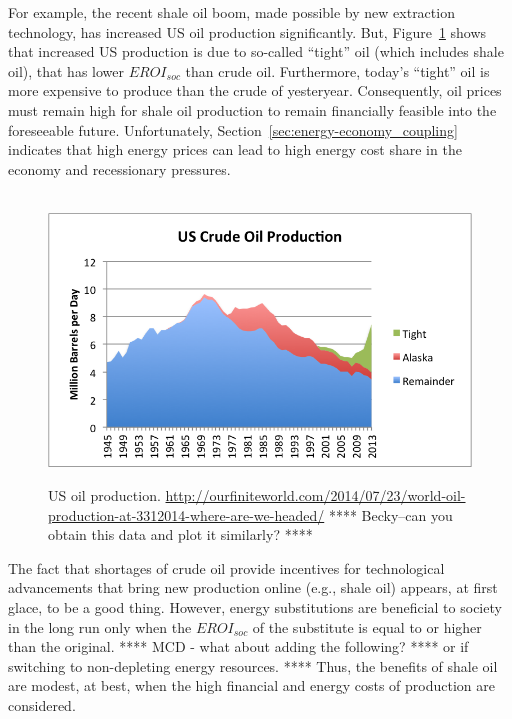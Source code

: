 For example, the recent shale oil boom, made possible by new extraction technology,
has increased US oil production significantly. 
But, Figure~\ref{fig:US_oil_production} shows that increased US production
is due to so-called ``tight'' oil (which includes shale oil), 
that has lower $EROI_{soc}$ than crude oil.\cite{Cleveland:2010aa}
Furthermore, today's ``tight'' oil is more expensive to produce 
than the crude of yesteryear.
Consequently, oil prices must remain high for 
shale oil production to remain financially feasible into the foreseeable future. 
Unfortunately, Section~\ref{sec:energy-economy_coupling} indicates that
high energy prices can lead to high energy cost share in the economy
and recessionary pressures.

\begin{figure}[!ht]
\centering\
\includegraphics[width=\linewidth]{Part_0/Chapter_Introduction/images/us-crude-oil-production-including-tight-oil.png}
\caption[US oil production]{US oil production.
\url{http://ourfiniteworld.com/2014/07/23/world-oil-production-at-3312014-where-are-we-headed/}
**** Becky--can you obtain this data and plot it similarly? ****
}
\label{fig:US_oil_production}
\end{figure}

The fact that shortages of crude oil provide incentives for 
technological advancements that bring new production online (e.g., shale oil)
appears, at first glace, to be a good thing.
However, energy substitutions are beneficial to society 
in the long run only when the $EROI_{soc}$ of the substitute
is equal to or higher than the original.
****
MCD - what about adding the following?
****
or if switching to non-depleting energy resources.
****
Thus, the benefits of shale oil are modest, at best, when the
high financial and energy costs of production are considered.

